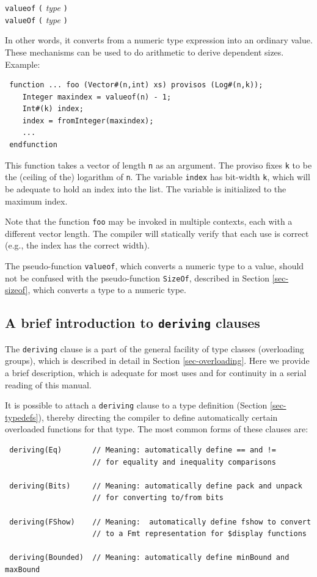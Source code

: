 \documentclass[twoside,letterpaper]{article}
\newcommand{\hm}{\hspace*{1em}}
\newcommand{\nterm}[1]{\emph{#1}}
\newcommand{\term}[1]{\texttt{#1}}
\newcommand{\alt}{{$\mid$}}
\newcommand{\gram}[2]{    \hm\makebox[10em][l]{\it #1}\makebox[1.5em][l]{::=}    #2}
\newcommand{\gramalt}[1]{ \hm\makebox[10em][l]{      }\makebox[1.5em][l]{\alt}   #1}
\begin{document}
\gram{exprPrimary}{ \term{valueof} \term{(} \nterm{type} \term{)}} \\
\gramalt { \term{valueOf} \term{(} \nterm{type} \term{)}}
                 
In other words, it converts from a numeric type expression into an
ordinary value.  These mechanisms can be used to do arithmetic to
derive dependent sizes. Example:
\begin{verbatim}
 function ... foo (Vector#(n,int) xs) provisos (Log#(n,k));
    Integer maxindex = valueof(n) - 1;
    Int#(k) index;
    index = fromInteger(maxindex);
    ...
 endfunction
\end{verbatim}
This function takes a vector of length \texttt{n} as an argument.  The
proviso fixes \texttt{k} to be the (ceiling of the) logarithm of \texttt{n}.
The variable \texttt{index} has bit-width \texttt{k}, which will be adequate
to hold an index into the list.  The variable is initialized to the
maximum index.

Note that the function \texttt{foo} may be invoked in multiple contexts,
each with a different vector length.  The compiler will statically
verify that each use is correct (e.g., the index has the correct
width).

The pseudo-function \texttt{valueof}, which converts a numeric type to a
value, should not be confused with the pseudo-function \texttt{SizeOf},
described in Section {\ref{sec-sizeof}}, which converts a type to a
numeric type.


\subsection{A brief introduction to \texttt{deriving} clauses}

\label{sec-deriving-brief}


The \texttt{deriving} clause is a part of the general facility of type
classes (overloading groups), which is described in detail in Section
\ref{sec-overloading}.
Here we provide a brief description, which is adequate for most uses
and for continuity in a serial reading of this manual.

It is possible to attach a \texttt{deriving} clause to a type definition
(Section \ref{sec-typedefs}), thereby directing the compiler to define
automatically certain overloaded functions for that type.  The most
common forms of these clauses are:
\begin{verbatim}
 deriving(Eq)       // Meaning: automatically define == and !=
                    // for equality and inequality comparisons

 deriving(Bits)     // Meaning: automatically define pack and unpack
                    // for converting to/from bits

 deriving(FShow)    // Meaning:  automatically define fshow to convert 
                    // to a Fmt representation for $display functions

 deriving(Bounded)  // Meaning: automatically define minBound and maxBound
\end{verbatim}
\end{document}
